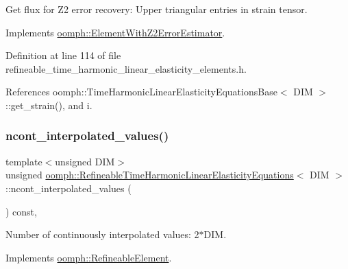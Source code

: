 Get \textquotesingle{}flux\textquotesingle{} for Z2 error recovery\+: Upper triangular entries in strain tensor. 



Implements \hyperlink{classoomph_1_1ElementWithZ2ErrorEstimator_a5688ff5f546d81771cabad82ca5a7556}{oomph\+::\+Element\+With\+Z2\+Error\+Estimator}.



Definition at line 114 of file refineable\+\_\+time\+\_\+harmonic\+\_\+linear\+\_\+elasticity\+\_\+elements.\+h.



References oomph\+::\+Time\+Harmonic\+Linear\+Elasticity\+Equations\+Base$<$ D\+I\+M $>$\+::get\+\_\+strain(), and i.

\mbox{\label{classoomph_1_1RefineableTimeHarmonicLinearElasticityEquations_a00935c8f08aaa87a054a55b901d47dad}} 
\subsubsection{\texorpdfstring{ncont\+\_\+interpolated\+\_\+values()}{ncont\_interpolated\_values()}}
{\footnotesize\ttfamily template$<$unsigned D\+IM$>$ \\
unsigned \hyperlink{classoomph_1_1RefineableTimeHarmonicLinearElasticityEquations}{oomph\+::\+Refineable\+Time\+Harmonic\+Linear\+Elasticity\+Equations}$<$ D\+IM $>$\+::ncont\+\_\+interpolated\+\_\+values (\begin{DoxyParamCaption}{ }\end{DoxyParamCaption}) const\hspace{0.3cm}{\ttfamily [inline]}, {\ttfamily [virtual]}}



Number of continuously interpolated values\+: 2$\ast$\+D\+IM. 



Implements \hyperlink{classoomph_1_1RefineableElement_a53e171a18c9f43f1db90a6876516a073}{oomph\+::\+Refineable\+Element}.



